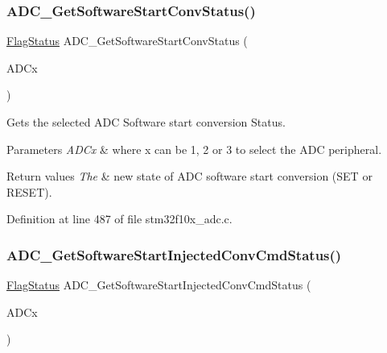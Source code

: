 \subsubsection{\texorpdfstring{A\+D\+C\+\_\+\+Get\+Software\+Start\+Conv\+Status()}{ADC\_GetSoftwareStartConvStatus()}}
{\footnotesize\ttfamily \hyperlink{group___exported__types_ga89136caac2e14c55151f527ac02daaff}{Flag\+Status} A\+D\+C\+\_\+\+Get\+Software\+Start\+Conv\+Status (\begin{DoxyParamCaption}\item[{\hyperlink{struct_a_d_c___type_def}{A\+D\+C\+\_\+\+Type\+Def} $\ast$}]{A\+D\+Cx }\end{DoxyParamCaption})}



Gets the selected A\+DC Software start conversion Status. 


\begin{DoxyParams}{Parameters}
{\em A\+D\+Cx} & where x can be 1, 2 or 3 to select the A\+DC peripheral. \\
\hline
\end{DoxyParams}

\begin{DoxyRetVals}{Return values}
{\em The} & new state of A\+DC software start conversion (S\+ET or R\+E\+S\+ET). \\
\hline
\end{DoxyRetVals}


Definition at line 487 of file stm32f10x\+\_\+adc.\+c.

\mbox{\label{group___a_d_c___private___functions_ga8765f8835b8cfed13dce3d8d71767dcc}} 
\subsubsection{\texorpdfstring{A\+D\+C\+\_\+\+Get\+Software\+Start\+Injected\+Conv\+Cmd\+Status()}{ADC\_GetSoftwareStartInjectedConvCmdStatus()}}
{\footnotesize\ttfamily \hyperlink{group___exported__types_ga89136caac2e14c55151f527ac02daaff}{Flag\+Status} A\+D\+C\+\_\+\+Get\+Software\+Start\+Injected\+Conv\+Cmd\+Status (\begin{DoxyParamCaption}\item[{\hyperlink{struct_a_d_c___type_def}{A\+D\+C\+\_\+\+Type\+Def} $\ast$}]{A\+D\+Cx }\end{DoxyParamCaption})}



